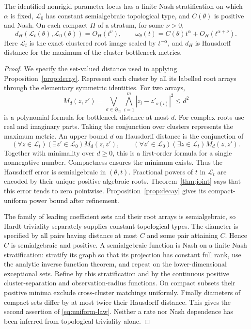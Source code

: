 \begin{theorem}\label{thm:uniform}
The identified nonrigid parameter locus has a finite Nash stratification
on which $\alpha$ is fixed, $\mathcal L_0$ has constant semialgebraic
topological type, and $C(\theta)$ is positive and Nash. On each compact
$H$ of a stratum, for some $\nu>0$,
\begin{equation}\label{eq:uniform-law}
 d_H(\mathcal L_t(\theta),\mathcal L_0(\theta))=O_H(t^\nu),\qquad
 \omega_\theta(t)=C(\theta)t^\alpha+O_H(t^{\alpha+\nu}).
\end{equation}
Here $\mathcal L_t$ is the exact clustered root image scaled by
$t^{-\alpha}$, and $d_H$ is Hausdorff distance for the maximum of the
cluster bottleneck metrics.
\end{theorem}
\begin{proof}
We specify the set-valued distance used in applying
Proposition~\ref{prop:decay}. Represent each cluster by all its labelled
root arrays through the elementary symmetric identities. For two arrays,
\begin{equation}\label{eq:matching-formula}
 M_d(z,z')=\bigvee_{\sigma\in\mathfrak S_m}
              \bigwedge_{i=1}^m |z_i-z'_{\sigma(i)}|^2\le d^2
\end{equation}
is a polynomial formula for bottleneck distance at most $d$. For complex
roots use real and imaginary parts. Taking the conjunction over clusters
represents the maximum metric. An upper bound $d$ on Hausdorff distance
is the conjunction of
\[
 (\forall z\in\mathcal L_t)(\exists z'\in\mathcal L_0)M_d(z,z'),
 \qquad
 (\forall z'\in\mathcal L_0)(\exists z\in\mathcal L_t)M_d(z,z').
\]
Together with minimality over $d\ge0$, this is a first-order formula for
a single nonnegative number. Compactness ensures the minimum exists.
Thus the Hausdorff error is semialgebraic in $(\theta,t)$. Fractional
powers of $t$ in $\mathcal L_t$ are encoded by their unique positive
algebraic roots. Theorem~\ref{thm:joint} says that this error tends to
zero pointwise. Proposition~\ref{prop:decay} gives its compact-uniform
power bound after refinement.

The family of leading coefficient sets and their root arrays is
semialgebraic, so Hardt triviality separately supplies constant topological
types. The diameter is specified by all pairs having distance at most
$C$ and some pair attaining $C$. Hence $C$ is semialgebraic and positive.
A semialgebraic function is Nash on a finite Nash stratification: stratify
its graph so that its projection has constant full rank, use the analytic
inverse function theorem, and repeat on the lower-dimensional exceptional
sets. Refine by this stratification and by the continuous positive
cluster-separation and observation-radius functions. On compact subsets
their positive minima exclude cross-cluster matchings uniformly.
Finally diameters of compact sets differ by at most twice their Hausdorff
distance. This gives the second assertion of \eqref{eq:uniform-law}.
Neither a rate nor Nash dependence has been inferred from topological
triviality alone.
\end{proof}


